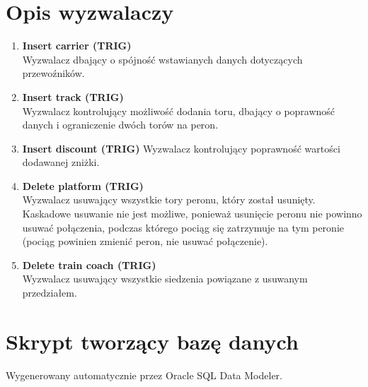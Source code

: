 \section{Opis wyzwalaczy}
\begin{enumerate}
    \item \textbf{Insert carrier (TRIG)}\\
    Wyzwalacz dbający o spójność wstawianych danych dotyczących przewoźników.\\
    
    \item \textbf{Insert track (TRIG)}\\
    Wyzwalacz kontrolujący możliwość dodania toru, dbający o poprawność danych i ograniczenie dwóch torów na peron.\\
    
    \item \textbf{Insert discount (TRIG)}
    Wyzwalacz kontrolujący poprawność wartości dodawanej zniżki.\\
    
    \item \textbf{Delete platform (TRIG)}\\
    Wyzwalacz usuwający wszystkie tory peronu, który został usunięty. Kaskadowe usuwanie nie jest możliwe, ponieważ usunięcie peronu nie powinno usuwać połączenia, podczas którego pociąg się zatrzymuje na tym peronie (pociąg powinien zmienić peron, nie usuwać połączenie).\\
    
    \item \textbf{Delete train coach (TRIG)}\\
    Wyzwalacz usuwający wszystkie siedzenia powiązane z usuwanym przedziałem.
\end{enumerate}

\section{Skrypt tworzący bazę danych}
Wygenerowany automatycznie przez Oracle SQL Data Modeler.


